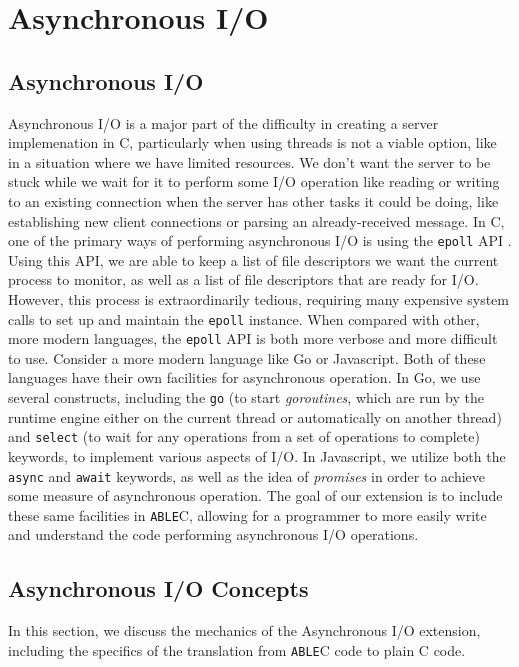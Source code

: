 \documentclass[main.tex]{subfiles}
\begin{document}
\section{Asynchronous I/O}

\subsection{Asynchronous I/O}
Asynchronous I/O is a major part of the difficulty in creating a server
implemenation in C, particularly when using threads is not a viable option, 
like in a situation where we have limited resources. We
don't want the server to be stuck while we wait for it to perform some I/O
operation like reading or writing to an existing connection when the server has
other tasks it could be doing, like establishing new client connections or
parsing an already-received message. In C, one of the primary ways of performing
asynchronous I/O is using the \verb|epoll| API \cite{5}. Using this API, we are able to
keep a list of file descriptors we want the current process to monitor, as well
as a list of file descriptors that are ready for I/O. However, this process is
extraordinarily tedious, requiring many expensive system calls to set up and
maintain the \verb|epoll| instance. When compared with other, more modern
languages, the \verb|epoll| API is both more verbose and more difficult to use.
Consider a more modern language like Go or Javascript. Both of these languages
have their own facilities for asynchronous operation. In Go, we use several
constructs, including the \verb|go| (to start \emph{goroutines}, which are run by the runtime engine
either on the current thread or automatically on another thread) and \verb|select| (to wait for any operations
from a set of operations to complete) keywords, to implement
various aspects of I/O. In Javascript, we utilize both the \verb|async| and
\verb|await| keywords, as well as the idea of \emph{promises} in order to
achieve some measure of asynchronous operation. The goal of our extension is to
include these same facilities in \verb|ABLE|C, allowing for a programmer to more
easily write and understand the code performing asynchronous I/O operations.

\subsection{Asynchronous I/O Concepts}
In this section, we discuss the mechanics of the Asynchronous I/O extension, including
the specifics of the translation from \verb|ABLE|C code to plain C code.
\end{document}
